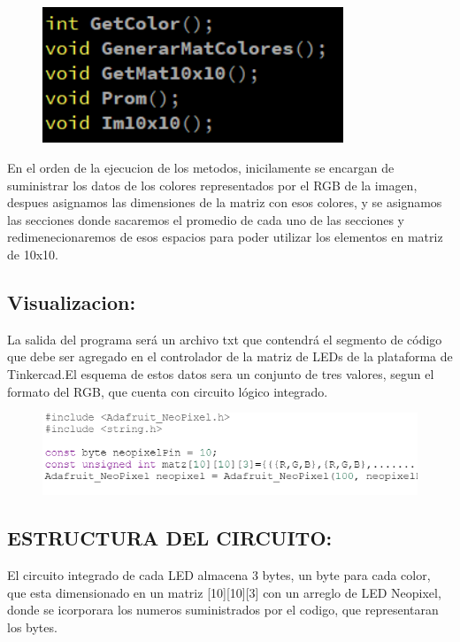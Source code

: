 \documentclass{article}
\begin{document}
\begin{figure}[h]
\includegraphics[width=9cm]{image.png}
\centering
\caption{}
\label{fig:tipos}
\end{figure}

En el orden de la ejecucion de los metodos, inicilamente se encargan de suministrar los datos de los colores representados por el RGB de la imagen, despues asignamos las dimensiones de la matriz con esos colores, y se asignamos  las secciones donde sacaremos el promedio de cada uno de las secciones y redimenecionaremos de esos espacios para poder utilizar los elementos en matriz de 10x10.



\subsection{Visualizacion:}
La salida del programa será un archivo txt que contendrá el segmento de código que debe ser agregado en el controlador de la matriz de LEDs de la plataforma de Tinkercad.El esquema de estos datos sera un conjunto de tres valores, segun el formato del RGB, que cuenta con circuito lógico integrado.


\begin{figure}[h]
\includegraphics[width=12cm]{arduino.PNG}
\centering
\caption{}
\label{fig:tipos}
\end{figure}





\vspace{1cm}
\begin{center}
\Huge
\section{ESTRUCTURA DEL CIRCUITO: }
\end{center}
El circuito integrado de cada LED  almacena 3 bytes, un byte para cada color, que esta dimensionado en un matriz [10][10][3] con un arreglo de LED Neopixel, donde se icorporara los numeros suministrados por el codigo, que representaran los bytes.
\end{document}
